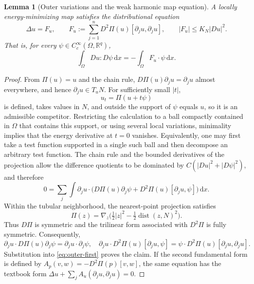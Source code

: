 \documentclass[11pt,a4paper]{article}
\numberwithin{equation}{section}
\newtheorem{lemma}[theorem]{Lemma}
\theoremstyle{definition}
\newcommand{\R}{\mathbb R}
\newcommand{\dd}{\,\mathrm d}
\newcommand{\dx}{\dd x}
\newcommand{\dist}{\operatorname{dist}}
\begin{document}
\begin{lemma}[Outer variations and the weak harmonic map equation]\label{lem:outer}
A locally energy-minimizing map satisfies the distributional equation
\begin{equation}\label{eq:weak-euler}
\Delta u=F_u,
\qquad
F_u:=\sum_{j=1}^n D^2\Pi(u)[\partial_j u,\partial_j u],
\qquad |F_u|\le K_N|Du|^2.
\end{equation}
That is, for every $\psi\in C_c^\infty(\Omega,\R^q)$,
\[
\int_\Omega Du:D\psi\dx=-\int_\Omega F_u\cdot\psi\dx.
\]
\end{lemma}
\begin{proof}
From $\Pi(u)=u$ and the chain rule, $D\Pi(u)\partial_j u=\partial_j u$ almost everywhere, and hence $\partial_j u\in T_{u}N$. For sufficiently small $|t|$,
\[
u_t=\Pi(u+t\psi)
\]
is defined, takes values in $N$, and outside the support of $\psi$ equals $u$, so it is an admissible competitor. Restricting the calculation to a ball compactly contained in $\Omega$ that contains this support, or using several local variations, minimality implies that the energy derivative at $t=0$ vanishes. Equivalently, one may first take a test function supported in a single such ball and then decompose an arbitrary test function. The chain rule and the bounded derivatives of the projection allow the difference quotients to be dominated by $C(|Du|^2+|D\psi|^2)$, and therefore
\begin{equation}\label{eq:outer-first}
0=\sum_j\int\partial_j u\cdot
\bigl(D\Pi(u)\partial_j\psi+D^2\Pi(u)[\partial_j u,\psi]\bigr)\dx.
\end{equation}
Within the tubular neighborhood, the nearest-point projection satisfies
\[
\Pi(z)=\nabla_z\bigl(\tfrac12|z|^2-\tfrac12\dist(z,N)^2\bigr).
\]
Thus $D\Pi$ is symmetric and the trilinear form associated with $D^2\Pi$ is fully symmetric. Consequently,
\[
\partial_j u\cdot D\Pi(u)\partial_j\psi=\partial_j u\cdot\partial_j\psi,
\quad
\partial_j u\cdot D^2\Pi(u)[\partial_j u,\psi]
=\psi\cdot D^2\Pi(u)[\partial_j u,\partial_j u].
\]
Substitution into \eqref{eq:outer-first} proves the claim. If the second fundamental form is defined by $A_p(v,w)=-D^2\Pi(p)[v,w]$, the same equation has the textbook form $\Delta u+\sum_j A_u(\partial_j u,\partial_j u)=0$.
\end{proof}
\end{document}
